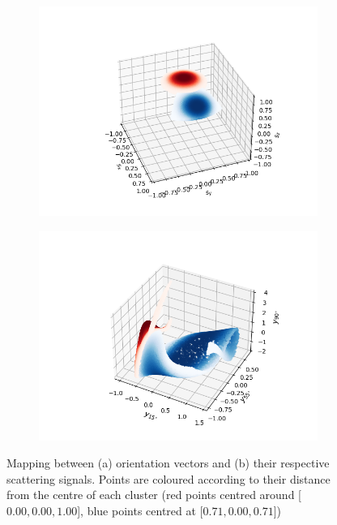 \documentclass[preprint,  3p]{elsarticle}
\begin{document}
\begin{figure}[h]
	\centering
	\begin{subfigure}{0.4\textwidth}
		\subcaption{}
		\includegraphics[width=\textwidth]{./Images/fig3a.png}
	\end{subfigure}
	\begin{subfigure}{0.4\textwidth}
		\subcaption{}
		\includegraphics[width=\textwidth]{./Images/fig3b.png}
	\end{subfigure}
	\caption{Mapping between (a) orientation vectors and (b) their respective scattering signals. Points are coloured according to their distance from the centre of each cluster (red points centred around [$0.00, 0.00, 1.00$], blue points centred at [$0.71, 0.00, 0.71$])}
	\label{fig:mixing}
\end{figure}
\end{document}
